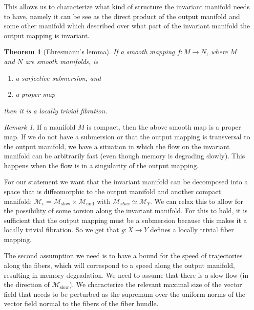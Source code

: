 \documentclass{article} %
\newcounter{ct}
\newcommand{\manifold}{\mathcal{M}}
\newtheorem{theorem}{Theorem}
\theoremstyle{definition}
\theoremstyle{remark}
\newtheorem{remark}{Remark}
\begin{document}
This allows us to characterize what kind of structure the invariant manifold needs to have, namely it can be see as the direct product of the output manifold and some other manifold which described over what part of the invariant manifold the output mapping is invariant.
\begin{theorem}[Ehresmann's lemma\citep{ehresmann1950connexions}]
If a smooth mapping \(f\colon M\rightarrow N\), where \(M\) and \(N\) are smooth manifolds, is
 \begin{enumerate}
\item a surjective submersion, and
\item a proper map
\end{enumerate}
then it is a locally trivial fibration.
\end{theorem}

\begin{remark}
If a manifold \(M\) is compact, then the above smooth map  is a proper map.
If we do not have a submersion or that the output mapping is transversal to the output manifold, we have a situation in which the flow on the invariant manifold can be arbitrarily fast  (even though memory is degrading slowly).
This happens when the flow is in a singularity of the output mapping.
\end{remark}

For our statement we want that the invariant manifold can be decomposed into a space that is diffeomorphic to the output manifold and another compact manifold: \(\manifold_\epsilon= \manifold_{\text{slow}}\times \manifold_{\text{null}}\) with \(\manifold_{slow}\simeq \manifold_Y\). We can relax this to allow for the possibility of some torsion along the invariant manifold.
For this to hold, it is sufficient that the output mapping must be a submersion because this makes it a locally trivial fibration.
So we get that \(g\colon X\rightarrow Y\) defines a locally trivial fiber mapping.


The second assumption we need is to have a bound for the speed of trajectories along the fibers, which will correspond to a speed along the output manifold, resulting in memory degradation.
We need to assume that there is a slow flow (in the direction of \(\manifold_\text{slow}\)).
We characterize the relevant maximal size of the vector field that needs to be perturbed as the  supremum over the uniform norms of the vector field normal to the fibers of the fiber bundle.
\end{document}
